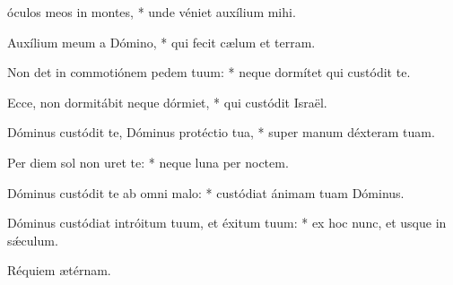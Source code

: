 \begin{psalmus}

 óculos meos in montes, * unde véniet auxílium mihi.

Auxílium meum a Dómino, * qui fecit cælum et terram.

Non det in commotiónem pedem tuum: * neque dormítet qui custódit te.

Ecce, non dormitábit neque dórmiet, * qui custódit Israël.

Dóminus custódit te, Dóminus protéctio tua, * super manum déxteram tuam.

Per diem sol non uret te: * neque luna per noctem.

Dóminus custódit te ab omni malo: * custódiat ánimam tuam Dóminus.

Dóminus custódiat intróitum tuum, et éxitum tuum: * ex hoc nunc, et usque in sǽculum.

Réquiem ætérnam.

\end{psalmus}
